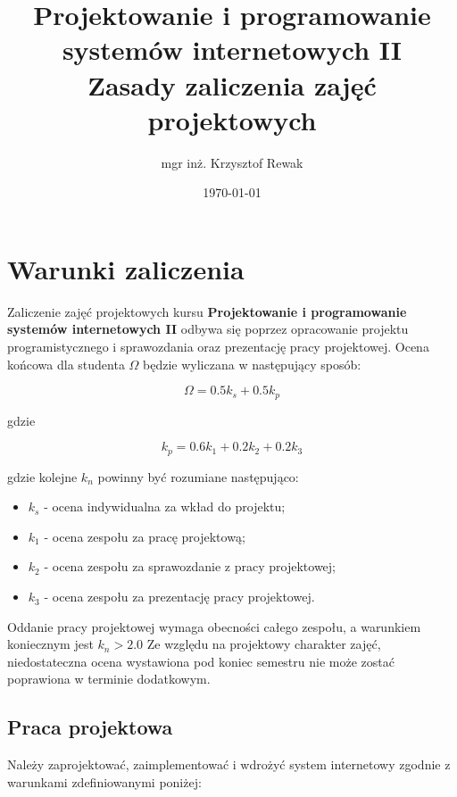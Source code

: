 \documentclass{article}
\title{
	Projektowanie i programowanie systemów internetowych II\\
	\Huge{Zasady zaliczenia zajęć projektowych}
}
\author{mgr inż. Krzysztof Rewak}
\date{\today}
\begin{document}
	\maketitle

	\section{Warunki zaliczenia}
	Zaliczenie zajęć projektowych kursu \textbf{Projektowanie i programowanie systemów internetowych II} odbywa się poprzez opracowanie projektu programistycznego i sprawozdania oraz prezentację pracy projektowej. Ocena końcowa dla studenta $\Omega$ będzie wyliczana w następujący sposób:

	\begin{equation} \label{eq:koncowa}
		\Omega = 0.5k_s + 0.5k_p
	\end{equation}

	gdzie

	\begin{equation} \label{eq:koncowa}
	 k_p = 0.6k_1 + 0.2k_2 + 0.2k_3
	\end{equation}

	gdzie kolejne $k_n$ powinny być rozumiane następująco:

	\begin{itemize}
		\item $k_s$ - ocena indywidualna za wkład do projektu;
		\item $k_1$ - ocena zespołu za pracę projektową;
		\item $k_2$ - ocena zespołu za sprawozdanie z pracy projektowej;
		\item $k_3$ - ocena zespołu za prezentację pracy projektowej.
	\end{itemize}

	Oddanie pracy projektowej wymaga obecności całego zespołu, a warunkiem koniecznym jest $k_n > 2.0$  Ze względu na projektowy charakter zajęć, niedostateczna ocena wystawiona pod koniec semestru nie może zostać poprawiona w terminie dodatkowym.

	\subsection{Praca projektowa}
	Należy zaprojektować, zaimplementować i wdrożyć system internetowy zgodnie z warunkami zdefiniowanymi poniżej:
\end{document}
